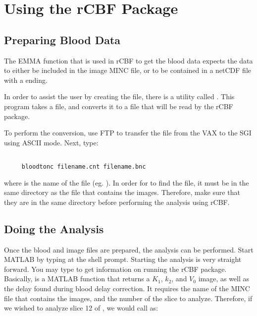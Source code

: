 \section{Using the rCBF Package}

\subsection{Preparing Blood Data}

The EMMA function  that is used in rCBF to get
the blood data expects the data to either be included in the image
MINC file, or to be contained in a netCDF file with a 
ending.

In order to assist the user by creating the  file, there
is a utility called .  This program takes a
 file, and converts it to a  file that will be
read by the rCBF package.

To perform the conversion, use FTP to transfer the  file
from the VAX to the SGI using ASCII mode.  Next, type:

\begin{verbatim}

     bloodtonc filename.cnt filename.bnc

\end{verbatim}

where  is the name of the file (eg.
).  In order for  to find the
 file, it must be in the same directory as the 
file that contains the images.  Therefore, make sure that they are in
the same directory before performing the analysis using rCBF.


\subsection{Doing the Analysis}

Once the blood and image files are prepared, the analysis can be
performed.  Start MATLAB by typing  at the shell prompt.
Starting the analysis is very straight forward.  You may type
 to get information on running the rCBF package.
Basically,  is a MATLAB function that returns a $K_1$,
$k_2$, and $V_0$ image, as well as the delay found during blood delay
correction.  It requires the name of the MINC file that contains the
images, and the number of the slice to analyze.  Therefore, if we
wished to analyze slice 12 of , we would call
 as:


